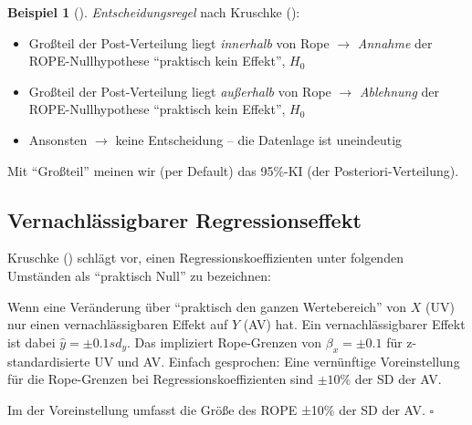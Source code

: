 \documentclass[
  ngerman,
  letterpaper,
  twoside,
  open=any]{scrbook}
\providecommand{\tightlist}{%
  \setlength{\itemsep}{0pt}\setlength{\parskip}{0pt}}\usepackage{longtable,booktabs,array}
\theoremstyle{definition}
\newtheorem{example}{Beispiel}[chapter]
\theoremstyle{plain}
\theoremstyle{definition}
\theoremstyle{definition}
\theoremstyle{remark}
\begin{document}
\begin{example}[]
\emph{Entscheidungsregel} nach Kruschke
():

\begin{itemize}
\tightlist
\item
  Großteil der Post-Verteilung liegt \emph{innerhalb} von Rope
  \(\rightarrow\) \emph{Annahme} der ROPE-Nullhypothese
  \enquote{praktisch kein Effekt}, \(H_0\)
\item
  Großteil der Post-Verteilung liegt \emph{außerhalb} von Rope
  \(\rightarrow\) \emph{Ablehnung} der ROPE-Nullhypothese
  \enquote{praktisch kein Effekt}, \(H_0\)
\item
  Ansonsten \(\rightarrow\) keine Entscheidung -- die Datenlage ist
  uneindeutig
\end{itemize}

Mit \enquote{Großteil} meinen wir (per Default) das 95\%-KI (der
Posteriori-Verteilung).

\subsection{Vernachlässigbarer
Regressionseffekt}\label{vernachluxe4ssigbarer-regressionseffekt}

Kruschke () schlägt vor, einen
Regressionskoeffizienten unter folgenden Umständen als
\enquote{praktisch Null} zu bezeichnen:

Wenn eine Veränderung über \enquote{praktisch den ganzen Wertebereich}
von \(X\) (UV) nur einen vernachlässigbaren Effekt auf \(Y\) (AV) hat.
Ein vernachlässigbarer Effekt ist dabei \(\hat{y}= \pm 0.1 sd_y\). Das
impliziert Rope-Grenzen von \(\beta_x = \pm 0.1\) für z-standardisierte
UV und AV. Einfach gesprochen: Eine vernünftige Voreinstellung für die
Rope-Grenzen bei Regressionskoeffizienten sind \(\pm 10 \%\) der SD der
AV.

\begin{tcolorbox}[enhanced jigsaw, arc=.35mm, bottomrule=.15mm, bottomtitle=1mm, breakable, colback=white, colbacktitle=quarto-callout-note-color!10!white, colframe=quarto-callout-note-color-frame, coltitle=black, left=2mm, leftrule=.75mm, opacityback=0, opacitybacktitle=0.6, rightrule=.15mm, title=\textcolor{quarto-callout-note-color}{\faInfo}\hspace{0.5em}{ROPE-Defaults}, titlerule=0mm, toprule=.15mm, toptitle=1mm]

Im der Voreinstellung umfasst die Größe des ROPE ±10\% der SD der AV.
\(\square\)

\end{tcolorbox}


\end{example}
\end{document}
